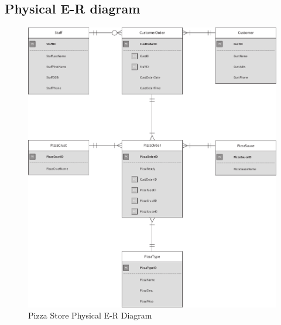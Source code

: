 \subsection{Physical E-R diagram}

\begin{figure}[H]
\centering
\caption{Pizza Store Physical E-R Diagram}
\includegraphics[scale=0.5]{./img/CSG1207_A1_PONCE_TASK_3_PER_PIZZA.pdf}
\end{figure}